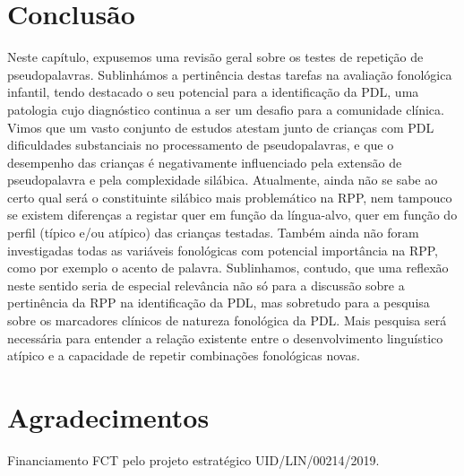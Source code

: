 \documentclass[output=paper,colorlinks,citecolor=brown,booklanguage=portuguese]{langscibook}
\begin{document}
\section{Conclusão}
Neste capítulo, expusemos uma revisão geral sobre os testes de repetição de pseudopalavras. Sublinhámos a pertinência destas tarefas na avaliação fonológica infantil, tendo destacado o seu potencial para a identificação da PDL, uma patologia cujo diagnóstico continua a ser um desafio para a comunidade clínica. Vimos que um vasto conjunto de estudos atestam junto de crianças com PDL dificuldades substanciais no processamento de pseudopalavras, e que o desempenho das crianças é negativamente influenciado pela extensão de pseudopalavra e pela complexidade silábica. Atualmente, ainda não se sabe ao certo qual será o constituinte silábico mais problemático na RPP, nem tampouco se existem diferenças a registar quer em função da língua-alvo, quer em função do perfil (típico e/ou atípico) das crianças testadas. Também ainda não foram investigadas todas as variáveis fonológicas com potencial importância na RPP, como por exemplo o acento de palavra. Sublinhamos, contudo, que uma reflexão neste sentido seria de especial relevância não só para a discussão sobre a pertinência da RPP na identificação da PDL, mas sobretudo para a pesquisa sobre os marcadores clínicos de natureza fonológica da PDL. Mais pesquisa será necessária para entender a relação existente entre o desenvolvimento linguístico atípico e a capacidade de repetir combinações fonológicas novas.

\section*{Agradecimentos}
Financiamento FCT pelo projeto estratégico UID/LIN/00214/2019.

{\sloppy\printbibliography[heading=subbibliography,notkeyword=this]}
\end{document}
